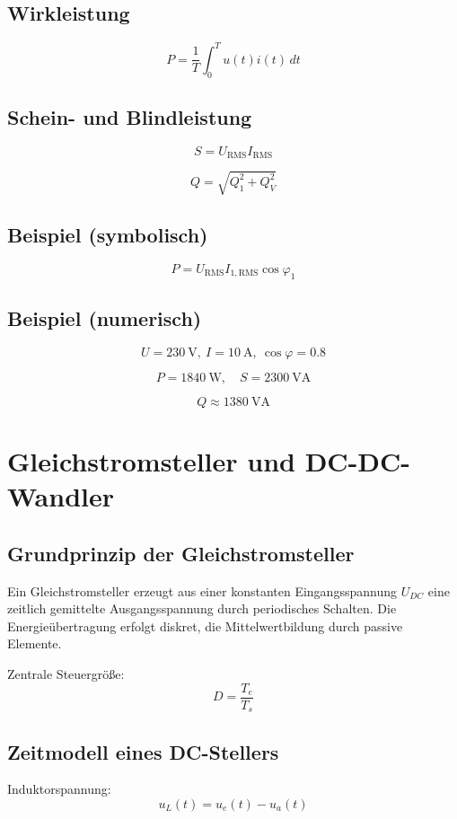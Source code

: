\documentclass[a4paper,11pt]{article}
\begin{document}
\subsection{Wirkleistung}
\[
P=\frac{1}{T}\int_0^T u(t)i(t)\,dt
\]

\subsection{Schein- und Blindleistung}
\[
S=U_{\mathrm{RMS}}I_{\mathrm{RMS}}
\]

\[
Q=\sqrt{Q_1^2+Q_V^2}
\]

\subsection*{Beispiel (symbolisch)}
\[
P=U_{\mathrm{RMS}}I_{1,\mathrm{RMS}}\cos\varphi_1
\]

\subsection*{Beispiel (numerisch)}
\[
U=\SI{230}{\volt},\ I=\SI{10}{\ampere},\ \cos\varphi=0.8
\]

\[
P=\SI{1840}{\watt},\quad S=\SI{2300}{\volt\ampere}
\]

\[
Q\approx\SI{1380}{\volt\ampere}
\]

\newpage
\section{Gleichstromsteller und DC-DC-Wandler}

\subsection{Grundprinzip der Gleichstromsteller}
Ein Gleichstromsteller erzeugt aus einer konstanten Eingangsspannung $U_{DC}$ eine zeitlich gemittelte Ausgangsspannung durch periodisches Schalten. Die Energieübertragung erfolgt diskret, die Mittelwertbildung durch passive Elemente.

Zentrale Steuergröße:
\[
D=\frac{T_e}{T_s}
\]

\subsection{Zeitmodell eines DC-Stellers}
Induktorspannung:
\[
u_L(t)=u_e(t)-u_a(t)
\]
\end{document}
